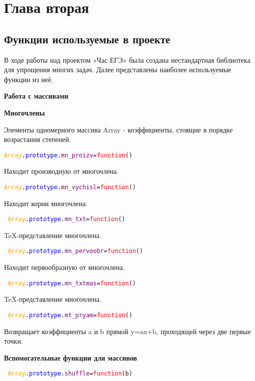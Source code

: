 \section{Глава вторая}
\subsection{Функции используемые в проекте}
В ходе работы над проектом «Час ЕГЭ» была создана нестандартная библиотека для упрощения многих задач. Далее представлены наиболее используемые функции из неё.

\textbf{Работа с массивами}

\textbf{Многочлены}

Элементы одномерного массива Array - коэффициенты, стоящие в порядке возрастания степеней.

\texttt{\textcolor{Orange}{Array}.\textcolor{Blue}{prototype}.\textcolor{Purple}{mn\_proizv}=\textcolor{Red}{function}()}

Находит производную от многочлена.

\texttt{\textcolor{Orange}{Array}.\textcolor{Blue}{prototype}.\textcolor{Purple}{mn\_vychisl}=\textcolor{Red}{function}()
}

Находит корни многочлена.

\texttt{
\textcolor{Orange}{Array}.\textcolor{Blue}{prototype}.\textcolor{Purple}{mn\_txt}=\textcolor{Red}{function}()}

TeX-представление многочлена.%

\texttt{
	\textcolor{Orange}{Array}.\textcolor{Blue}{prototype}.\textcolor{Purple}{mn\_pervoobr}=\textcolor{Red}{function}()
}

Находит первообразную от многочлена.%

\texttt{
	\textcolor{Orange}{Array}.\textcolor{Blue}{prototype}.\textcolor{Purple}{mn\_txtmas}=\textcolor{Red}{function}()
}

TeX-представление многочлена.

\texttt{
	\textcolor{Orange}{Array}.\textcolor{Blue}{prototype}.\textcolor{Purple}{mt\_pryam}=\textcolor{Red}{function}()
}

Возвращает коэффициенты a и b прямой y=ax+b, проходящей через две первые точки.

\textbf{Вспомогательные функции для массивов}

\texttt{
	\textcolor{Orange}{Array}.\textcolor{Blue}{prototype}.\textcolor{Purple}{shuffle}=\textcolor{Red}{function}(b)
}

